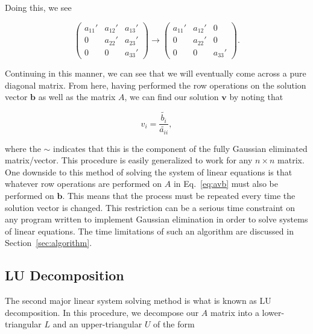 \documentclass[12pt]{article}
\numberwithin{equation}{section}
\begin{document}
\noindent Doing this, we see 

$$\left(
\begin{array}{ccc}
a_{11}\prime & a_{12}\prime & a_{13}\prime \\
0 & a_{22}\prime & a_{23}\prime \\
0 & 0 & a_{33}\prime
\end{array}\right) \rightarrow
\left(\begin{array}{ccc}
a_{11}\prime & a_{12}\prime & 0 \\
0 & a_{22}\prime & 0 \\
0 & 0 & a_{33}\prime 
\end{array}\right).$$
\vspace{.2cm}

\noindent Continuing in this manner, we can see that we will eventually come across a pure diagonal matrix.  From here, having performed the row operations on the solution vector $\textbf{b}$ as well as the matrix $A$, we can find our solution $\textbf{v}$ by noting that 

\begin{equation}
v_{i} = \frac{\widetilde{b_{i}}}{\widetilde{a_{ii}}},
\end{equation}
\vspace{.1cm}

\noindent where the $\sim$ indicates that this is the component of the fully Gaussian eliminated matrix/vector.  This procedure is easily generalized to work for any $n\times n$ matrix.
\\\indent One downside to this method of solving the system of linear equations is that whatever row operations are performed on $A$ in Eq.~\ref{eq:avb} must also be performed on $\textbf{b}$.  This means that the process must be repeated every time the solution vector is changed.  This restriction can be a serious time constraint on any program written to implement Gaussian elimination in order to solve systems of linear equations.  The time limitations of such an algorithm are discussed in Section~\ref{sec:algorithm}.

\subsection{LU Decomposition}
\label{subsec:ludecomp}

The second major linear system solving method is what is known as LU decomposition.  In this procedure, we decompose our $A$ matrix into a lower-triangular $L$ and an upper-triangular $U$ of the form
\end{document}
